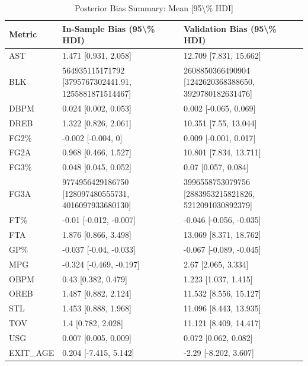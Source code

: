 \begin{table}[t]
\caption*{
{\fontsize{20}{25}\selectfont  Posterior Bias Summary: Mean [95\textbackslash{}\% HDI]\fontsize{12}{15}\selectfont }
} 
\fontsize{12.0pt}{14.0pt}\selectfont
\begin{tabular*}{\linewidth}{@{\extracolsep{\fill}}lll}
\toprule
Metric & In-Sample Bias (95\textbackslash{}\% HDI) & Validation Bias (95\textbackslash{}\% HDI) \\ 
\midrule\addlinespace[2.5pt]
AST & 1.471 [0.931, 2.058] & 12.709 [7.831, 15.662] \\ 
BLK & 564935115171792 [3795767302441.91, 1255881871514467] & 2608850366490904 [1242620368388650, 3929780182631476] \\ 
DBPM & 0.024 [0.002, 0.053] & 0.002 [-0.065, 0.069] \\ 
DREB & 1.322 [0.826, 2.061] & 10.351 [7.55, 13.044] \\ 
FG2\% & -0.002 [-0.004, 0] & 0.009 [-0.001, 0.017] \\ 
FG2A & 0.968 [0.466, 1.527] & 10.801 [7.834, 13.711] \\ 
FG3\% & 0.048 [0.045, 0.052] & 0.07 [0.057, 0.084] \\ 
FG3A & 9774956429186750 [128097480555731, 4016097933680130] & 3996558753079756 [2883953215821826, 5212091030892379] \\ 
FT\% & -0.01 [-0.012, -0.007] & -0.046 [-0.056, -0.035] \\ 
FTA & 1.876 [0.866, 3.498] & 13.069 [8.371, 18.762] \\ 
GP\% & -0.037 [-0.04, -0.033] & -0.067 [-0.089, -0.045] \\ 
MPG & -0.324 [-0.469, -0.197] & 2.67 [2.065, 3.334] \\ 
OBPM & 0.43 [0.382, 0.479] & 1.223 [1.037, 1.415] \\ 
OREB & 1.487 [0.882, 2.124] & 11.532 [8.556, 15.127] \\ 
STL & 1.453 [0.888, 1.968] & 11.096 [8.443, 13.935] \\ 
TOV & 1.4 [0.782, 2.028] & 11.121 [8.409, 14.417] \\ 
USG & 0.007 [0.005, 0.009] & 0.072 [0.062, 0.082] \\ 
EXIT\_AGE & 0.204 [-7.415, 5.142] & -2.29 [-8.202, 3.607] \\ 
\bottomrule
\end{tabular*}
\end{table}

